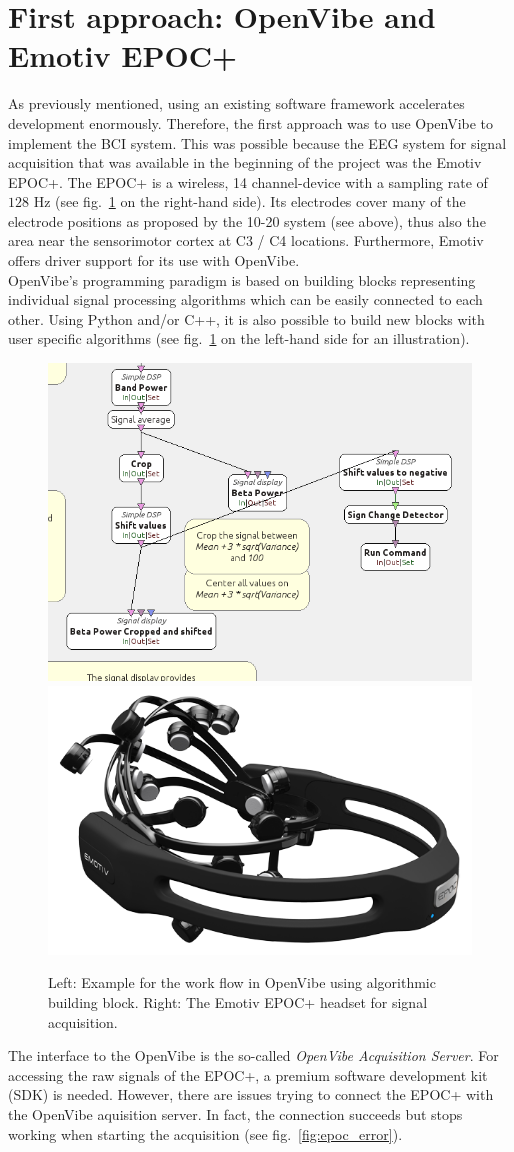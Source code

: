 \documentclass[a4paper,twoside, openright,12pt]{report}
\begin{document}
\section{First approach: OpenVibe and Emotiv EPOC+}
As previously mentioned, using an existing software framework accelerates development enormously. Therefore, the first approach was to use OpenVibe to implement the BCI system. This was possible because the EEG system for signal acquisition that was available in the beginning of the project was the Emotiv EPOC+. The EPOC+ is a wireless, 14 channel-device with a sampling rate of $128$ Hz (see fig.~\ref*{fig:openvibe_blocks} on the right-hand side). Its electrodes cover many of the electrode positions as proposed by the 10-20 system (see above), thus also the area near the sensorimotor cortex at C3 / C4 locations. Furthermore, Emotiv offers driver support for its use with OpenVibe.\\
OpenVibe's programming paradigm is based on building blocks representing individual signal processing algorithms which can be easily connected to each other. Using Python and/or C++, it is also possible to build new blocks with user specific algorithms (see fig.~\ref{fig:openvibe_blocks} on the left-hand side for an illustration).
\begin{figure}[tbph!]
\centering
\includegraphics[width=0.6\linewidth]{gfx/openvibe_blocks}
\includegraphics[width=0.39\linewidth]{gfx/emotiv_epoc}
\caption{Left: Example for the work flow in OpenVibe using algorithmic building block. Right: The Emotiv EPOC+ headset for signal acquisition.}
\label{fig:openvibe_blocks}
\end{figure}
The interface to the OpenVibe is the so-called \textit{OpenVibe Acquisition Server}. For accessing the raw signals of the EPOC+, a premium software development kit (SDK) is needed. However, there are issues trying to connect the EPOC+ with the OpenVibe aquisition server. In fact, the connection succeeds but stops working when starting the acquisition (see fig.~\ref{fig:epoc_error}).
 
\end{document}
